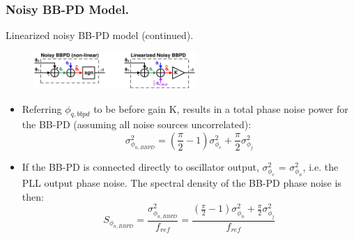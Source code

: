 \documentclass[t, screen, aspectratio=43]{beamer}
\begin{document}
\begin{frame}
	\frametitle{Noisy BB-PD Model.}
	\begin{block}{Linearized noisy BB-PD model (continued).}
	\tiny
	\begin{figure}[htb!]
	    \centering
		\includegraphics[width=0.55\textwidth, angle=0]{bbpd_noise_linearized.pdf}
	\end{figure}
	\begin{itemize}[itemsep=4pt,label=\protect---]
		\item Referring $\phi_{q,bbpd}$ to be before gain K, results in a total phase noise power for the BB-PD (assuming all noise sources uncorrelated):
		\tiny
		\begin{equation}
			\sigma^2_{\phi_{n,BBPD}} =   \left(\frac{\pi}{2}-1\right)\sigma^2_{\phi_e} + \frac{\pi}{2}\sigma^2_{\phi_j}
		\end{equation}
		\item If the BB-PD is connected directly to oscillator output, $\sigma^2_{\phi_e}$ = $\sigma^2_{\phi_n}$, i.e. the PLL output phase noise. The spectral density of the BB-PD phase noise is then:
		\begin{equation}
			S_{\phi_{n,BBPD}} = \frac{\sigma^2_{\phi_{n,BBPD}}}{f_{ref}} =  \frac{\left(\frac{\pi}{2}-1\right)\sigma^2_{\phi_n} + \frac{\pi}{2}\sigma^2_{\phi_j}}{f_{ref}}
		\end{equation}
	\end{itemize}

	\end{block}	
\end{frame}
\end{document}
